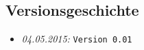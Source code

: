 \documentclass{fhnwreport/fhnwreport}
\begin{document}


\tableofcontents
\vspace{80mm}
\subsection*{Versionsgeschichte}
\begin{itemize}
    \item[]
        \emph{04.05.2015:} \texttt{Version 0.01}
\end{itemize}
\clearpage

%
%
%
%

%


%
%
%
\end{document}
